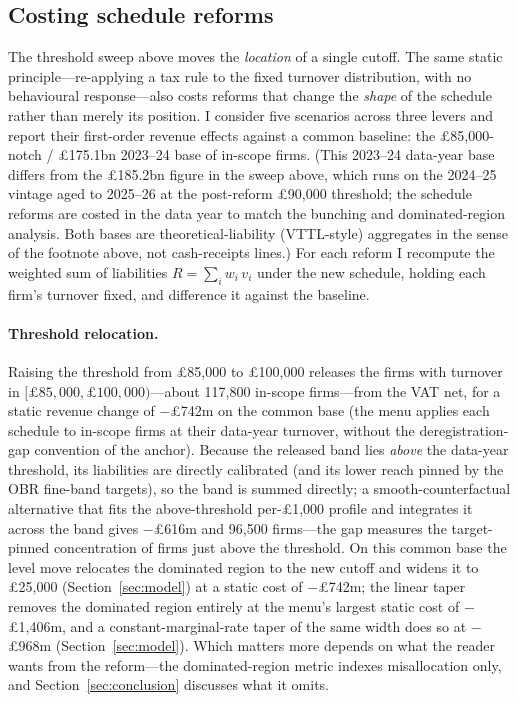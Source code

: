 \subsection{Costing schedule reforms}
\label{ssec:schedule_costs}

The threshold sweep above moves the \emph{location} of a single cutoff. The same
static principle---re-applying a tax rule to the fixed turnover distribution, with
no behavioural response---also costs reforms that change the \emph{shape} of the
schedule rather than merely its position. I consider five scenarios across three levers and report
their first-order revenue effects against a common baseline: the
\pounds85{,}000-notch / \pounds175.1bn 2023--24 base of in-scope firms. (This
2023--24 data-year base differs from the \pounds185.2bn figure in the sweep above, which runs on the
2024--25 vintage aged to 2025--26 at the post-reform \pounds90{,}000 threshold;
the schedule reforms are costed in the data year to match the bunching and
dominated-region analysis. Both bases are theoretical-liability (VTTL-style)
aggregates in the sense of the footnote above, not cash-receipts lines.) For each
reform I recompute the weighted sum of liabilities $R = \sum_i w_i\, v_i$ under
the new schedule, holding each firm's turnover fixed, and difference it against
the baseline.

\paragraph{Threshold relocation.} Raising the threshold from \pounds85{,}000 to
\pounds100{,}000 releases the firms with turnover in
$[\pounds85{,}000, \pounds100{,}000)$---about 117{,}800 in-scope
firms---from the VAT net, for a static revenue change of \(-\)\pounds742m on the
common base (the menu applies each schedule to in-scope firms at their data-year
turnover, without the deregistration-gap convention of the anchor). Because the
released band lies \emph{above} the data-year threshold, its liabilities are
directly calibrated (and its lower reach pinned by the OBR fine-band targets),
so the band is summed directly; a smooth-counterfactual alternative that fits
the above-threshold per-\pounds1{,}000 profile and integrates it across the
band gives \(-\)\pounds616m and 96{,}500 firms---the gap measures
the target-pinned concentration of firms just above the threshold. On this
common base the level move relocates the dominated region to the new cutoff and
widens it to \pounds25{,}000 (Section~\ref{sec:model}) at a static cost of
\(-\)\pounds742m; the linear taper removes the dominated region entirely at the
menu's largest static cost of \(-\)\pounds1{,}406m, and a constant-marginal-rate taper of
the same width does so at \(-\)\pounds968m (Section~\ref{sec:model}). Which matters more depends on what the
reader wants from the reform---the dominated-region metric indexes
misallocation only, and Section~\ref{sec:conclusion} discusses what it omits.

